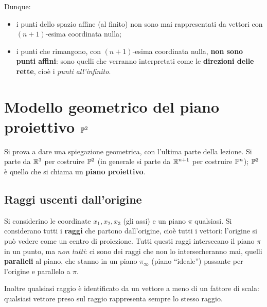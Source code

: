 Dunque:
\begin{itemize}
  \item i punti dello spazio affine (al finito) non sono mai rappresentati da vettori con $(n+1)$-esima coordinata nulla;
  \item i punti che rimangono, con $(n+1)$-esima coordinata nulla, \textbf{non sono punti affini}: sono quelli che verranno interpretati come le \textbf{direzioni delle rette}, cioè i \emph{punti all'infinito}.
\end{itemize}

\section{Modello geometrico del piano proiettivo $\mathbb{P}^2$}

Si prova a dare una spiegazione geometrica, con l'ultima parte della lezione. Si parte da $\mathbb{R}^3$ per costruire $\mathbb{P}^2$ (in generale si parte da $\mathbb{R}^{n+1}$ per costruire $\mathbb{P}^n$); $\mathbb{P}^2$ è quello che si chiama un \textbf{piano proiettivo}.

\subsection{Raggi uscenti dall'origine}

Si considerino le coordinate $x_1,x_2,x_3$ (gli assi) e un piano $\pi$ qualsiasi. Si considerano tutti i \textbf{raggi} che partono dall'origine, cioè tutti i vettori: l'origine si può vedere come un centro di proiezione. Tutti questi raggi intersecano il piano $\pi$ in un punto, ma \emph{non tutti}: ci sono dei raggi che non lo intersecheranno mai, quelli \textbf{paralleli} al piano, che stanno in un piano $\pi_\infty$ (piano ``ideale'') passante per l'origine e parallelo a $\pi$.

Inoltre qualsiasi raggio è identificato da un vettore a meno di un fattore di scala: qualsiasi vettore preso sul raggio rappresenta sempre lo stesso raggio.

\begin{center}
\end{center}

